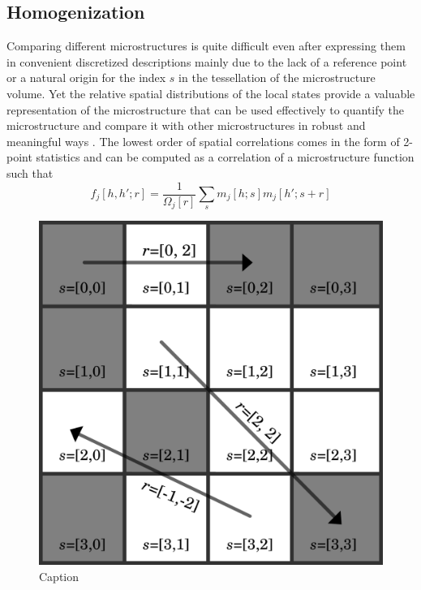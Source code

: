 \documentclass{bmcart}
\begin{document}
\subsection{Homogenization}

Comparing different microstructures is quite difficult even after
expressing them in convenient discretized descriptions mainly due to
the lack of a reference point or a natural origin for the index $s$ in
the tessellation of the microstructure volume. Yet the relative
spatial distributions of the local states provide a valuable
representation of the microstructure that can be used effectively to
quantify the microstructure and compare it with other microstructures
in robust and meaningful ways \cite{niezgoda2011understanding,
  niezgoda2010optimized, niezgoda2013novel, cceccen2014data,
  cecen2016versatile}. The lowest order of spatial correlations comes
in the form of 2-point statistics and can be computed as a correlation
of a microstructure function such that
\begin{equation}\label{eq:stats}
    f_j[h, h'; r] = \frac{1}{\Omega_j\left[r\right]} \sum_{s} m_j[h; s] m_j[h'; s +  r]
\end{equation}
\begin{figure}
    \centering
    \includegraphics{fig/stats_micro_example.png}
    \caption{Caption}
    \label{fig:stats}
\end{figure}
\end{document}
